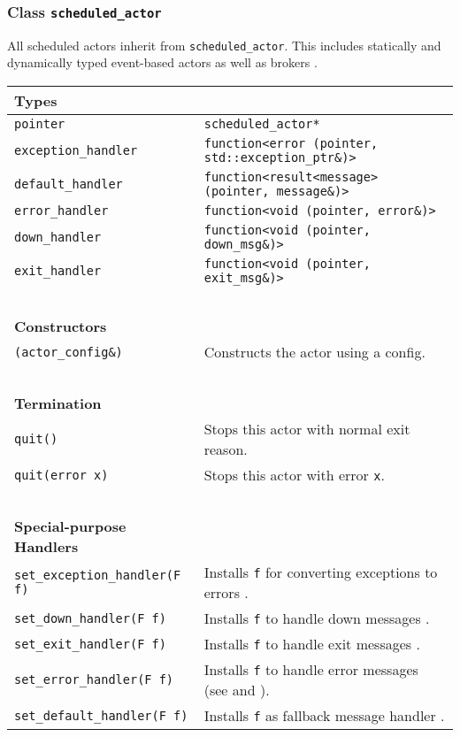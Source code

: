 \clearpage
\subsubsection{Class \lstinline^scheduled_actor^}

All scheduled actors inherit from \lstinline^scheduled_actor^. This includes
statically and dynamically typed event-based actors as well as brokers
.

\begin{center}
\begin{tabular}{ll}
  \textbf{Types} & ~ \\
  \hline
  \lstinline^pointer^ & \lstinline^scheduled_actor*^ \\
  \hline
  \lstinline^exception_handler^ & \lstinline^function<error (pointer, std::exception_ptr&)>^ \\
  \hline
  \lstinline^default_handler^ & \lstinline^function<result<message> (pointer, message&)>^ \\
  \hline
  \lstinline^error_handler^ & \lstinline^function<void (pointer, error&)>^ \\
  \hline
  \lstinline^down_handler^ & \lstinline^function<void (pointer, down_msg&)>^ \\
  \hline
  \lstinline^exit_handler^ & \lstinline^function<void (pointer, exit_msg&)>^ \\
  \hline
  ~ & ~ \\ \textbf{Constructors} & ~ \\
  \hline
  \lstinline^(actor_config&)^ & Constructs the actor using a config. \\
  \hline
  ~ & ~ \\ \textbf{Termination} & ~ \\
  \hline
  \lstinline^quit()^ & Stops this actor with normal exit reason. \\
  \hline
  \lstinline^quit(error x)^ & Stops this actor with error \lstinline^x^. \\
  \hline
  ~ & ~ \\ \textbf{Special-purpose Handlers} & ~ \\
  \hline
  \lstinline^set_exception_handler(F f)^ & Installs \lstinline^f^ for converting exceptions to errors . \\
  \hline
  \lstinline^set_down_handler(F f)^ & Installs \lstinline^f^ to handle down messages . \\
  \hline
  \lstinline^set_exit_handler(F f)^ & Installs \lstinline^f^ to handle exit messages . \\
  \hline
  \lstinline^set_error_handler(F f)^ & Installs \lstinline^f^ to handle error messages (see  and ). \\
  \hline
  \lstinline^set_default_handler(F f)^ & Installs \lstinline^f^ as fallback message handler . \\
  \hline
\end{tabular}
\end{center}

